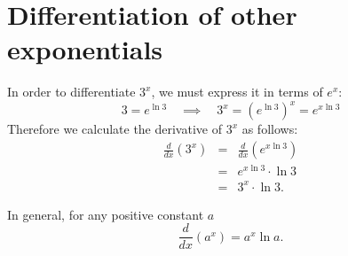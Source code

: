 \section{Differentiation of other exponentials}
\begin{example}
In order to differentiate $3^x$, we must express it in terms of $e^x$:
\[3=e^{\ln 3}\quad \implies\quad 3^x=(e^{\ln 3})^x=e^{x\ln 3}\]
Therefore we calculate the derivative of $3^x$ as follows:
\begin{eqnarray*}
\frac{d}{dx}(3^x) &=& \frac{d}{dx}(e^{x\ln 3}) \\
&=& e^{x\ln 3}\cdot\ln 3 \\
&=& 3^x \cdot \ln 3.
\end{eqnarray*}
\end{example}
\begin{in_a_box}
In general, for any positive constant $a$
\[\frac{d}{dx}(a^x)=a^x\ln a.\]
\end{in_a_box}
